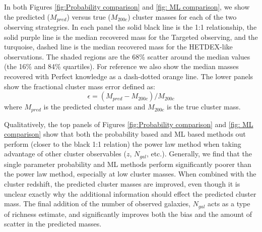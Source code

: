 \documentclass[fleqn,usenatbib]{mnras}
\begin{document}
In both Figures \ref{fig:Probability comparison} and \ref{fig: ML comparison}, we show the predicted ($M_{pred}$) versus true ($M_{200c}$) cluster masses for each of the two observing strategries. In each panel the solid black line is the 1:1 relationship, the solid purple line is the median recovered mass for the Targeted observing, and the turquoise, dashed line is the median recovered mass for the HETDEX-like observations. The shaded regions are the 68\% scatter around the median values (the 16\% and 84\% quartiles). For reference we also show the median masses recovered with Perfect knowledge as a dash-dotted orange line. The lower panels show the fractional cluster mass error defined as: 
\begin{equation}\label{eq: fractional error}
	\epsilon = (M_{pred} - M_{200c})/M_{200c}
\end{equation}
where $M_{pred}$ is the predicted cluster mass and $M_{200c}$ is the true cluster mass.

Qualitatively, the top panels of Figures \ref{fig:Probability comparison} and \ref{fig: ML comparison} show that both the probability based and ML based methods out perform (closer to the black 1:1 relation) the power law method when taking advantage of other cluster observables ($z$, $N_{gal}$, etc.). Generally, we find that the single parameter probability and ML methods perform significantly poorer than the power law method, especially at low cluster masses. When combined with the cluster redshift, the predicted cluster masses are improved, even though it is unclear exactly why the additional information should effect the predicted cluster mass. The final addition of the number of observed galaxies, $N_{gal}$ acts as a type of richness estimate, and significantly improves both the bias and the amount of scatter in the predicted masses.
\end{document}
